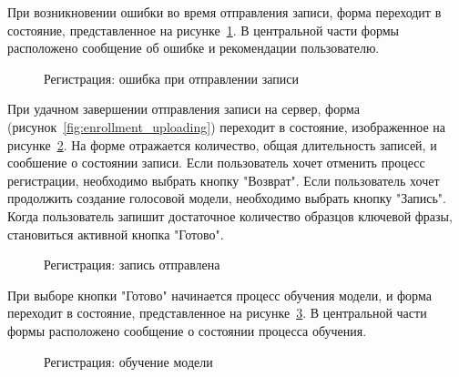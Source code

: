 При возникновении ошибки во время отправления записи, форма переходит в состояние, представленное на рисунке~\ref{fig:enrollment_upload_error}. В центральной части формы расположено сообщение об ошибке и рекомендации пользователю. 


\begin{figure}[hbt!]
\caption{Регистрация: ошибка при отправлении записи}
\label{fig:enrollment_upload_error}
\end{figure}



При удачном завершении отправления записи на сервер, форма (рисунок~\ref{fig:enrollment_uploading}) переходит в состояние, изображенное на рисунке~\ref{fig:enrollment_uploaded}. На форме отражается количество, общая длительность записей, и сообшение о состоянии записи. Если пользователь хочет отменить процесс регистрации, необходимо выбрать кнопку "Возврат". Если пользователь хочет продолжить создание голосовой модели, необходимо выбрать кнопку "Запись". Когда пользователь запишит достаточное количество образцов ключевой фразы, становиться активной кнопка "Готово".


\begin{figure}[hbt!]
\caption{Регистрация: запись отправлена}
\label{fig:enrollment_uploaded}
\end{figure}

При выборе кнопки "Готово" начинается процесс обучения модели, и форма переходит в состояние, представленное на рисунке~\ref{fig:enrollment_in_process}. В центральной части формы расположено сообщение о состоянии процесса обучения.

\begin{figure}[hbt!]
\caption{Регистрация: обучение модели}
\label{fig:enrollment_in_process}
\end{figure}

